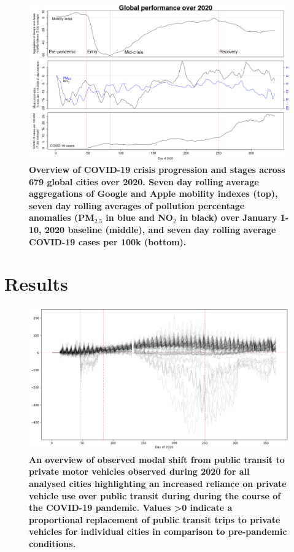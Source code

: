 \documentclass[preprint,12pt]{elsarticle}
\begin{document}
\begin{figure}
\centering
\includegraphics[trim={0 0 15 20},clip,scale=0.45]{Images/LancetPHOverall.png}
\caption{\bf Overview of COVID-19 crisis progression and stages across 679 global cities over 2020. Seven day rolling average aggregations of Google and Apple mobility indexes (top), seven day rolling averages of pollution percentage anomalies (PM$_{2.5}$ in blue and NO$_{2}$ in black) over January 1-10, 2020 baseline (middle), and seven day rolling average COVID-19 cases per 100k (bottom).}
 \label{fig:stages}
\end{figure}

\section*{Results}

\begin{figure}
\centering
\includegraphics[trim={0 0 0 0},clip,scale=0.4]{Images/DrivingvsTransit.png}
\caption{\bf An overview of observed modal shift from public transit to private motor vehicles observed during 2020 for all analysed cities highlighting an increased reliance on private vehicle use over public transit during during the course of the COVID-19 pandemic. Values \textgreater 0 indicate a proportional replacement of public transit trips to private vehicles for individual cities in comparison to pre-pandemic conditions.}  
 \label{fig:driv_trans}
\end{figure}
\end{document}
